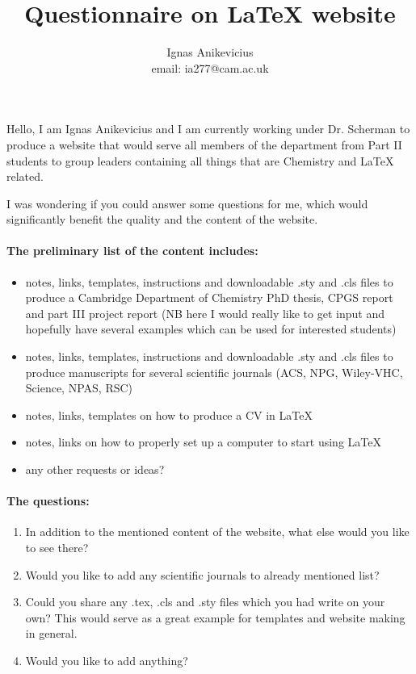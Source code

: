 \documentclass[a4paper]{article}
\begin{document}
\title{Questionnaire on LaTeX website}

\author{Ignas Anikevicius\\ email: ia277@cam.ac.uk}

\maketitle

\thispagestyle{empty}

Hello, I am Ignas Anikevicius and I am currently working under Dr. Scherman to
produce a website that would serve all members of the department from Part II
students to group leaders containing all things that are Chemistry and \LaTeX
related.

I was wondering if you could answer some questions for me, which would
significantly benefit the quality and the content of the website.

\paragraph{The preliminary list of the content includes:}

\begin{itemize}
    \item notes, links, templates, instructions and downloadable .sty and .cls
        files to produce a Cambridge Department of Chemistry PhD thesis, CPGS
        report and part III project report (NB here I would really like to get
        input and hopefully have several examples which can be used for
        interested students)
    \item notes, links, templates, instructions and downloadable .sty and .cls
        files to produce manuscripts for several scientific journals (ACS, NPG,
        Wiley-VHC, Science, NPAS, RSC)
    \item notes, links, templates on how to produce a CV in LaTeX 
    \item notes, links on how to properly set up a computer to start using LaTeX
    \item any other requests or ideas?
\end{itemize}

\paragraph{The questions:}
\begin{enumerate}
    \item In addition to the mentioned content of the website, what else would
        you like to see there?
    \item Would you like to add any scientific journals to already mentioned
        list?
    \item Could you share any .tex, .cls and .sty files which you had write on
        your own? This would serve as a great example for templates and website
        making in general.
    \item Would you like to add anything?
\end{enumerate}
\end{document}
